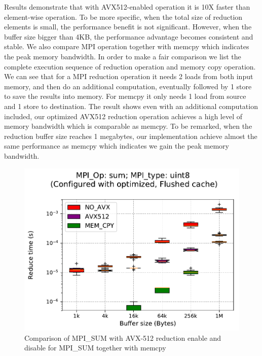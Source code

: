 \documentclass[sigconf,review]{acmart}
\newcommand{\mpi}[0]{\textsc{MPI}\xspace}
\begin{document}
Results demonstrate that with AVX512-enabled operation it is 10X faster than element-wise operation.
To be more specific, when the total size of reduction elements is small, the performance benefit is
not significant. However, when the buffer size bigger than 4KB, the performance advantage becomes consistent and stable.
We also compare MPI operation together with memcpy which indicates the peak memory bandwidth.
In order to make a fair comparison we list the complete execution sequence of reduction operation and memory copy operation.
We can see that for a \mpi reduction operation it needs 2 loads from both input memory, and then do an additional computation, eventually followed by 1 store to save the results into memory. For memcpy it only needs 1 load from source and 1 store to destination.
The result shows even with an additional computation included, our optimized AVX512 reduction operation achieves
a high level of memory bandwidth which is comparable as memcpy.
To be remarked, when the reduction buffer size reaches 1 megabytes,
our implementation achieve almost the same performance as memcpy which indicates
we gain the peak memory bandwidth.

\begin{figure}[h]
    \centering
    \includegraphics[trim={0 0 0 1.5cm},clip, width=\linewidth]{avx_sum.pdf}
    \caption{Comparison of MPI\_SUM with AVX-512 reduction enable and disable for MPI\_SUM together with memcpy}
    \label{fig:avx_sum}
\end{figure}
\end{document}
